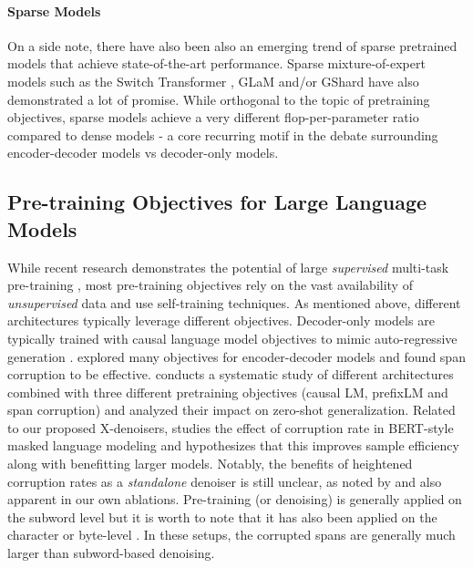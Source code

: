 \documentclass[10pt]{article}
\begin{document}
\paragraph{Sparse Models} On a side note, there have also been also an emerging trend of sparse pretrained models that achieve state-of-the-art performance. Sparse mixture-of-expert models such as the Switch Transformer \citep{fedus2021switch}, GLaM \citep{du2021glam} and/or GShard \citep{lepikhin2020gshard} have also demonstrated a lot of promise. While orthogonal to the topic of pretraining objectives, sparse models achieve a very different flop-per-parameter ratio compared to dense models - a core recurring motif in the debate surrounding encoder-decoder models vs decoder-only models. 


\subsection{Pre-training Objectives for Large Language Models}
While recent research demonstrates the potential of large \emph{supervised} multi-task pre-training \citep{aribandi2021ext5,sanh2021multitask,wang2022language}, most pre-training objectives rely on the vast availability of \emph{unsupervised} data and use self-training techniques.
As mentioned above, different architectures typically leverage different objectives. Decoder-only models are typically trained with causal language model objectives to mimic auto-regressive generation \citep{Radford2019}. \citet{raffel2019exploring} explored many objectives for encoder-decoder models and found span corruption to be effective. \citep{wang2022language} conducts a systematic study of different architectures combined with three different pretraining objectives (causal LM, prefixLM and span corruption) and analyzed their impact on zero-shot generalization. Related to our proposed X-denoisers, \citep{wettig2022should} studies the effect of corruption rate in BERT-style masked language modeling and hypothesizes that this improves sample efficiency along with benefitting larger models. Notably, the benefits of heightened corruption rates as a \textit{standalone} denoiser is still unclear, as noted by \citep{raffel2019exploring} and also apparent in our own ablations. Pre-training (or denoising) is generally applied on the subword level \citep{raffel2019exploring,devlin2018bert} but it is worth to note that it has also been applied on the character or byte-level \citep{xue2021byt5,tay2021charformer}. In these setups, the corrupted spans are generally much larger than subword-based denoising.
\end{document}
